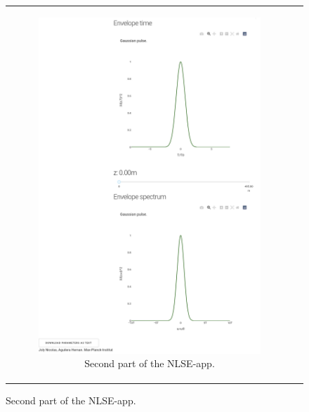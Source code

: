 \begin{figure}[label={fig:herokunlse}, caption={NLSE-App accesed via Google Chrome in an Android device.}]
\begin{tabular}[c]{cc}
\begin{subfigure}[b]{.53\textwidth}
            \includegraphics[width=1\textwidth]{figures/chap4/android_nlse2.png}
            \caption{Second part of the NLSE-app.}
            \label{fig:herokunlse2}
        \end{subfigure}
        \end{tabular}
        \end{figure}
